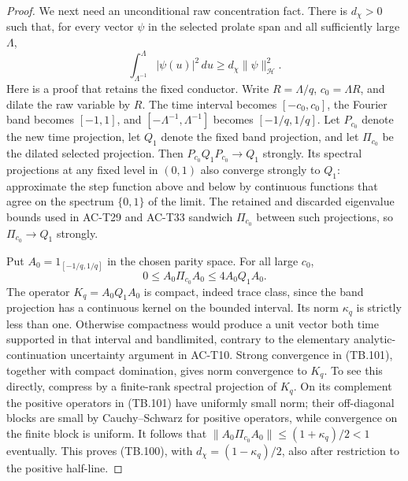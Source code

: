 \begin{proof}
We next need an unconditional raw concentration fact.
There is \(d_\chi>0\) such that, for every vector \(\psi\)
in the selected prolate span and all sufficiently large
\(\Lambda\),
\[
           \int_{\Lambda^{-1}}^\Lambda|\psi(u)|^2\,du
                         \geq d_\chi\|\psi\|_{\mathcal H}^2.
 \tag{TB.100}
\]
Here is a proof that retains the fixed conductor.
Write \(R=\Lambda/q\), \(c_0=\Lambda R\), and dilate the
raw variable by \(R\).
The time interval becomes \([-c_0,c_0]\), the Fourier
band becomes \([-1,1]\), and
\([-\Lambda^{-1},\Lambda^{-1}]\) becomes
\([-1/q,1/q]\).
Let \(P_{c_0}\) denote the new time projection, let
\(Q_1\) denote the fixed band projection, and let
\(\Pi_{c_0}\) be the dilated selected projection.
Then \(P_{c_0}Q_1P_{c_0}\to Q_1\) strongly.
Its spectral projections at any fixed level in \((0,1)\)
also converge strongly to \(Q_1\): approximate the step
function above and below by continuous functions that
agree on the spectrum \(\{0,1\}\) of the limit.
The retained and discarded eigenvalue bounds used in
AC-T29 and AC-T33 sandwich \(\Pi_{c_0}\) between such
projections, so \(\Pi_{c_0}\to Q_1\) strongly.

Put \(A_0=1_{[-1/q,1/q]}\) in the chosen parity space.
For all large \(c_0\),
\[
 0\leq A_0\Pi_{c_0}A_0
      \leq4A_0Q_1A_0.
 \tag{TB.101}
\]
The operator \(K_q=A_0Q_1A_0\) is compact, indeed trace
class, since the band projection has a continuous kernel
on the bounded interval.
Its norm \(\kappa_q\) is strictly less than one.
Otherwise compactness would produce a unit vector both
time supported in that interval and bandlimited, contrary
to the elementary analytic-continuation uncertainty
argument in AC-T10.
Strong convergence in (TB.101), together with compact
domination, gives norm convergence to \(K_q\).
To see this directly, compress by a finite-rank spectral
projection of \(K_q\).  On its complement the positive
operators in (TB.101) have uniformly small norm; their
off-diagonal blocks are small by Cauchy--Schwarz for
positive operators, while convergence on the finite
block is uniform.
It follows that
\(\|A_0\Pi_{c_0}A_0\|\leq(1+\kappa_q)/2<1\)
eventually.  This proves (TB.100), with
\(d_\chi=(1-\kappa_q)/2\), also after restriction to the
positive half-line.


\end{proof}
